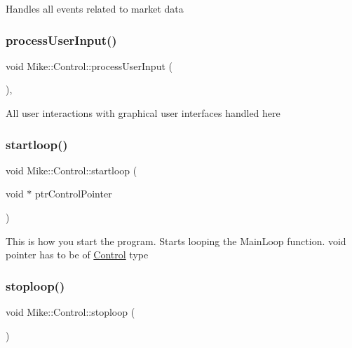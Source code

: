 Handles all events related to market data \mbox{\label{class_mike_1_1_control_ad06eaf996f971a758eea1fd55eda2565}} 
\subsubsection{\texorpdfstring{process\+User\+Input()}{processUserInput()}}
{\footnotesize\ttfamily void Mike\+::\+Control\+::process\+User\+Input (\begin{DoxyParamCaption}{ }\end{DoxyParamCaption})\hspace{0.3cm}{\ttfamily [inline]}, {\ttfamily [private]}}

All user interactions with graphical user interfaces handled here \mbox{\label{class_mike_1_1_control_ae34c60ef30c2de2332df13b644c7791f}} 
\subsubsection{\texorpdfstring{startloop()}{startloop()}}
{\footnotesize\ttfamily void Mike\+::\+Control\+::startloop (\begin{DoxyParamCaption}\item[{void $\ast$}]{ptr\+Control\+Pointer }\end{DoxyParamCaption})\hspace{0.3cm}{\ttfamily [static]}}

This is how you start the program. Starts looping the Main\+Loop function. void pointer has to be of \hyperlink{class_mike_1_1_control}{Control} type \mbox{\label{class_mike_1_1_control_aa26389eedd6e1c60fa64fe7883ce6ce8}} 
\subsubsection{\texorpdfstring{stoploop()}{stoploop()}}
{\footnotesize\ttfamily void Mike\+::\+Control\+::stoploop (\begin{DoxyParamCaption}{ }\end{DoxyParamCaption})}

